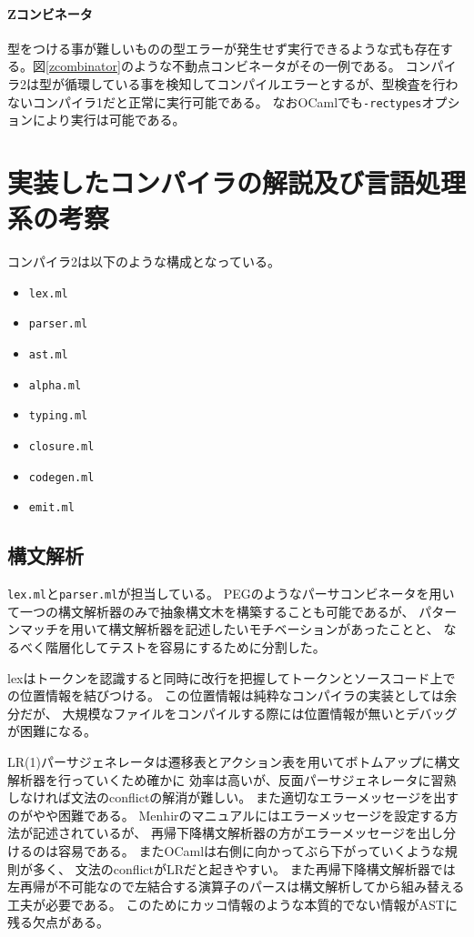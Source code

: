 \documentclass[report]{jlreq}
\begin{document}
      \subsubsection{Zコンビネータ}
        型をつける事が難しいものの型エラーが発生せず実行できるような式も存在する。図\ref{zcombinator}のような不動点コンビネータがその一例である。
        コンパイラ2は型が循環している事を検知してコンパイルエラーとするが、型検査を行わないコンパイラ1だと正常に実行可能である。
        なおOCamlでも\texttt{-rectypes}オプションにより実行は可能である。
        

  \chapter{実装したコンパイラの解説及び言語処理系の考察}
    コンパイラ2は以下のような構成となっている。
    \begin{itemize}
      \item \texttt{lex.ml}
      \item \texttt{parser.ml}
      \item \texttt{ast.ml}
      \item \texttt{alpha.ml}
      \item \texttt{typing.ml}
      \item \texttt{closure.ml}
      \item \texttt{codegen.ml}
      \item \texttt{emit.ml}
    \end{itemize}
    \section{構文解析}
      \texttt{lex.ml}と\texttt{parser.ml}が担当している。
      PEGのようなパーサコンビネータを用いて一つの構文解析器のみで抽象構文木を構築することも可能であるが、
      パターンマッチを用いて構文解析器を記述したいモチベーションがあったことと、
      なるべく階層化してテストを容易にするために分割した。

      lexはトークンを認識すると同時に改行を把握してトークンとソースコード上での位置情報を結びつける。
      この位置情報は純粋なコンパイラの実装としては余分だが、
      大規模なファイルをコンパイルする際には位置情報が無いとデバッグが困難になる。

      LR(1)パーサジェネレータは遷移表とアクション表を用いてボトムアップに構文解析器を行っていくため確かに
      効率は高いが、反面パーサジェネレータに習熟しなければ文法のconflictの解消が難しい。
      また適切なエラーメッセージを出すのがやや困難である。
      Menhirのマニュアルにはエラーメッセージを設定する方法が記述されているが、
      再帰下降構文解析器の方がエラーメッセージを出し分けるのは容易である。
      またOCamlは右側に向かってぶら下がっていくような規則が多く、
      文法のconflictがLRだと起きやすい。
      また再帰下降構文解析器では左再帰が不可能なので左結合する演算子のパースは構文解析してから組み替える工夫が必要である。
      このためにカッコ情報のような本質的でない情報がASTに残る欠点がある。
\end{document}
